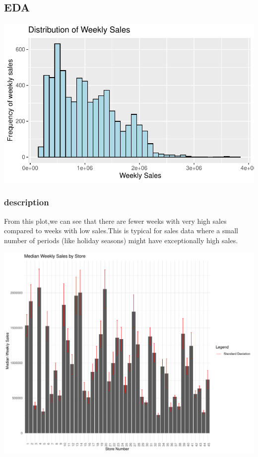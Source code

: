 \documentclass[
  letterpaper,
  DIV=11,
  numbers=noendperiod]{scrartcl}
\begin{document}
\hypertarget{eda}{%
\subsection{EDA}\label{eda}}

\includegraphics{678final_files/figure-pdf/distribution-plot-1.pdf}

\hypertarget{description}{%
\subsubsection{description}\label{description}}

From this plot,we can see that there are fewer weeks with very high
sales compared to weeks with low sales.This is typical for sales data
where a small number of periods (like holiday seasons) might have
exceptionally high sales.

\includegraphics{678final_files/figure-pdf/bin-plot-1.pdf}
\end{document}
